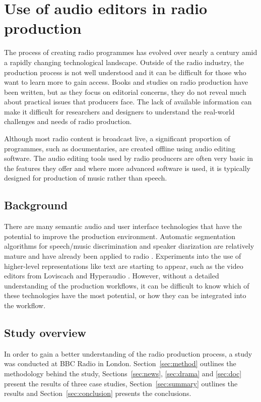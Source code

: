 \chapter{Use of audio editors in radio production}\label{chp:ethno}

The process of creating radio programmes has evolved over nearly a century amid a rapidly changing technological
landscape. Outside of the radio industry, the production process is not well understood and it can be difficult for
those who want to learn more to gain access. Books \citep{Hausman2012} and studies \citep{Dunaway2000} on radio
production have been written, but as they focus on editorial concerns, they do not reveal much about practical issues
that producers face.  The lack of available information can make it difficult for researchers and designers to
understand the real-world challenges and needs of radio production.

Although most radio content is broadcast live, a significant proportion of programmes, such as documentaries, are
created offline using audio editing software. The audio editing tools used by radio producers are often very basic in
the features they offer and where more advanced software is used, it is typically designed for production of music
rather than speech.

\section{Background}

There are many semantic audio and user interface technologies that have the potential to improve the production
environment. Automatic segmentation algorithms for speech/music discrimination \citep{Wieser2014} and speaker
diarization \citep{AngueraMiro2012} are relatively mature and have already been applied to radio \citep{Raimond2014}.
Experiments into the use of higher-level representations like text are starting to appear, such as the video editors
from Loviscach \citep{Loviscach2011a} and Hyperaudio \citep{Boas2011}.  However, without a detailed understanding of
the production workflows, it can be difficult to know which of these technologies have the most potential, or how they
can be integrated into the workflow.

\section{Study overview}

In order to gain a better understanding of the radio production process, a study was conducted at BBC Radio in London.
Section~\ref{sec:method} outlines the methodology behind the study, Sections~\ref{sec:news}, \ref{sec:drama} and
\ref{sec:doc} present the results of three case studies, Section~\ref{sec:summary} outlines the results and
Section~\ref{sec:conclusion} presents the conclusions.

